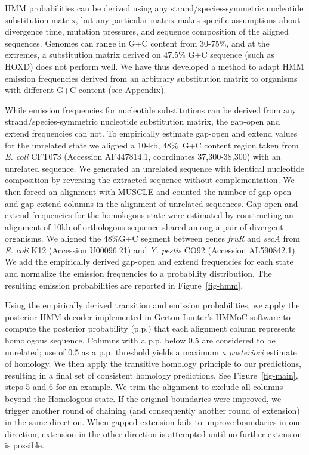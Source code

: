 \documentclass{llncs}
\begin{document}
HMM probabilities can be derived using any strand/species-symmetric nucleotide substitution matrix,
but any particular matrix makes specific assumptions about divergence time, mutation pressures,
and sequence composition of the aligned sequences.
Genomes can range in G+C content from 30-75\%, and at the extremes,
a substitution matrix derived on 47.5\% G+C sequence (such as HOXD) does not
perform well.  We have thus developed a method to adapt HMM emission
frequencies derived from an arbitrary substitution matrix
to organisms with different G+C content (see Appendix).  

While emission frequencies for nucleotide substitutions can be derived from
any strand/species-symmetric nucleotide substitution matrix, the gap-open
and extend frequencies can not.  To empirically estimate gap-open and extend values
for the unrelated state we aligned a 10-kb, 48\%~G+C content region
taken from \emph{E. coli} CFT073 (Accession AF447814.1, coordinates
37,300-38,300) with an unrelated sequence.  We generated an unrelated
sequence with identical nucleotide composition by reversing the
extracted sequence without complementation.  We then forced an
alignment with MUSCLE and counted the number of gap-open and gap-extend
columns in the alignment of unrelated sequences.  Gap-open and
extend frequencies for the homologous state were estimated by
constructing an alignment of 10kb of orthologous sequence shared among
a pair of divergent organisms.  We aligned the 48\%G+C segment between
genes \textit{fruR} and \textit{secA} from \textit{E. coli} K12
(Accession U00096.21) and \emph{Y. pestis} CO92 (Accession
AL590842.1). We add the empirically derived gap-open and extend
frequencies for each state and normalize the emission frequencies to a
probability distribution.  The resulting emission probabilities are
reported in Figure~\ref{fig-hmm}.

Using the empirically derived transition and emission probabilities,
we apply the posterior HMM decoder implemented in Gerton Lunter's
HMMoC software\cite{Lunter2007} to compute the posterior probability (p.p.) that
each alignment column represents homologous sequence.  Columns with a
p.p. below 0.5 are considered to be unrelated; use of 0.5 as a p.p. threshold
yields a maximum \textit{a posteriori} estimate of homology.  We then apply the
transitive homology principle to our predictions, resulting in a final
set of consistent homology predictions.  See Figure~\ref{fig-main},
steps 5 and 6 for an example. We trim the alignment to exclude all
columns beyond the Homologous state. If the original boundaries were
improved, we trigger another round of chaining (and consequently
another round of extension) in the same direction.
When gapped extension fails to improve boundaries
in one direction, extension in the other direction is attempted until
no further extension is possible.
\end{document}
